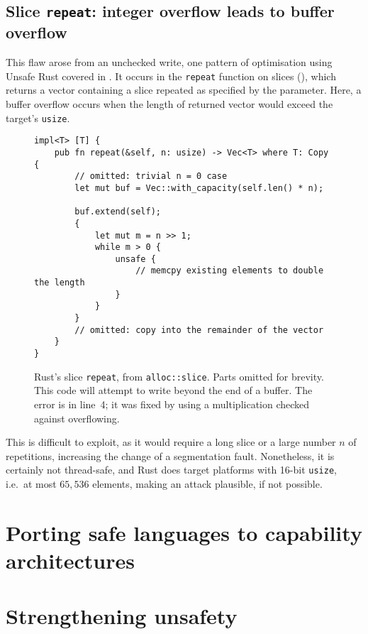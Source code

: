 \documentclass[dissertation.tex]{subfiles}
\begin{document}


\subsection{Slice \texttt{repeat}: integer overflow leads to buffer overflow}
\label{sec:eval-micro-repeat}

This flaw arose from an unchecked write, one pattern of optimisation
using Unsafe Rust covered in .
It occurs in the \texttt{repeat} function on slices
(), which returns a vector containing a slice
repeated as specified by the parameter.
Here, a buffer overflow occurs when the length of returned vector would
exceed the target's \texttt{usize}.

\begin{figure}[ht]
\begin{lstlisting}
impl<T> [T] {
    pub fn repeat(&self, n: usize) -> Vec<T> where T: Copy {
        // omitted: trivial n = 0 case
        let mut buf = Vec::with_capacity(self.len() * n);

        buf.extend(self);
        {
            let mut m = n >> 1;
            while m > 0 {
                unsafe {
                    // memcpy existing elements to double the length
                }
            }
        }
        // omitted: copy into the remainder of the vector
    }
}
\end{lstlisting}
\caption{ Rust's slice \texttt{repeat}, from
\texttt{alloc::slice}. Parts omitted for brevity. This code will attempt
to write beyond the end of a buffer.
The error is in line~4; it was fixed by using a multiplication checked
against overflowing.}
\label{lst:slice-repeat}
\end{figure}


This is difficult to exploit, as it would require a long slice or a
large number \(n\) of repetitions, increasing the change of a
segmentation fault.
Nonetheless, it is certainly not thread-safe, and Rust does target
platforms with 16-bit \texttt{usize}, i.e.\ at most \(65,536\) elements,
making an attack plausible, if not possible.


\section{Porting safe languages to capability architectures}
\label{sec:eval-othersafe}


\section{Strengthening unsafety}
\label{sec:eval-betterunsafe}
\end{document}
